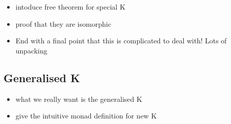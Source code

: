 \documentclass[runningheads]{llncs}
\begin{document}
\begin{itemize}
\item
  intoduce free theorem for special K
\item
  proof that they are isomorphic
\item
  End with a final point that this is complicated to deal with! Lots of
  unpacking
\end{itemize}

\subsection{Generalised K}\label{generalised-k}

\begin{itemize}
\tightlist
\item
  what we really want is the generalised K
\end{itemize}

\begin{Shaded}
\begin{Highlighting}[]
 \OtherTok{=} \OtherTok{{-}\textgreater{}}\OtherTok{{-}\textgreater{}}
\end{Highlighting}
\end{Shaded}

\begin{itemize}
\tightlist
\item
  give the intuitive monad definition for new K
\end{itemize}

\begin{Shaded}
\begin{Highlighting}[]
 \OtherTok{{-}\textgreater{}}\OtherTok{{-}\textgreater{}} \OtherTok{{-}\textgreater{}} 
\OtherTok{=}\OtherTok{{-}\textgreater{}}
\end{Highlighting}
\end{Shaded}

\begin{Shaded}
\begin{Highlighting}[]
\OtherTok{{-}\textgreater{}} 
\OtherTok{=}
\end{Highlighting}
\end{Shaded}
\end{document}
